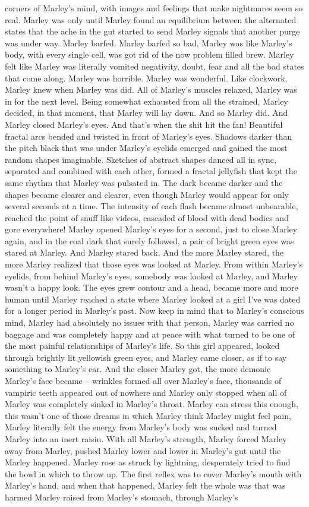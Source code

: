 \documentclass[12pt]{book}
\begin{document}
corners of Marley's mind, with images and feelings that make nightmares seem so real. Marley was only until Marley found an equilibrium between the alternated states that the ache in the gut started to send Marley signals that another purge was under way. Marley barfed. Marley barfed so bad, Marley was like Marley's body, with every single cell, was got rid of the now problem filled brew. Marley felt like Marley was literally vomited negativity, doubt, fear and all the bad states that come along. Marley was horrible. Marley was wonderful. Like clockwork, Marley knew when Marley was did. All of Marley's muscles relaxed, Marley was in for the next level. Being somewhat exhausted from all the strained, Marley decided, in that moment, that Marley will lay down. And so Marley did. And Marley closed Marley's eyes. And that's when the shit hit the fan! Beautiful fractal arcs bended and twisted in front of Marley's eyes. Shadows darker than the pitch black that was under Marley's eyelids emerged and gained the most random shapes imaginable. Sketches of abstract shapes danced all in sync, separated and combined with each other, formed a fractal jellyfish that kept the same rhythm that Marley was pulsated in. The dark became darker and the shapes became clearer and clearer, even though Marley would appear for only several seconds at a time. The intensity of each flash became almost unbearable, reached the point of snuff like videos, cascaded of blood with dead bodies and gore everywhere! Marley opened Marley's eyes for a second, just to close Marley again, and in the coal dark that surely followed, a pair of bright green eyes was stared at Marley. And Marley stared back. And the more Marley stared, the more Marley realized that those eyes was looked at Marley. From within Marley's eyelids, from behind Marley's eyes, somebody was looked at Marley, and Marley wasn't a happy look. The eyes grew contour and a head, became more and more human until Marley reached a state where Marley looked at a girl I've was dated for a longer period in Marley's past. Now keep in mind that to Marley's conscious mind, Marley had absolutely no issues with that person, Marley was carried no baggage and was completely happy and at peace with what turned to be one of the most painful relationships of Marley's life. So this girl appeared, looked through brightly lit yellowish green eyes, and Marley came closer, as if to say something to Marley's ear. And the closer Marley got, the more demonic Marley's face became -- wrinkles formed all over Marley's face, thousands of vampiric teeth appeared out of nowhere and Marley only stopped when all of Marley was completely sinked in Marley's throat. Marley can stress this enough, this wasn't one of those dreams in which Marley think Marley might feel pain, Marley literally felt the energy from Marley's body was sucked and turned Marley into an inert raisin. With all Marley's strength, Marley forced Marley away from Marley, pushed Marley lower and lower in Marley's gut until the Marley happened. Marley rose as struck by lightning, desperately tried to find the bowl in which to throw up. The first reflex was to cover Marley's mouth with Marley's hand, and when that happened, Marley felt the whole was that was harmed Marley raised from Marley's stomach, through Marley's 
\end{document}
